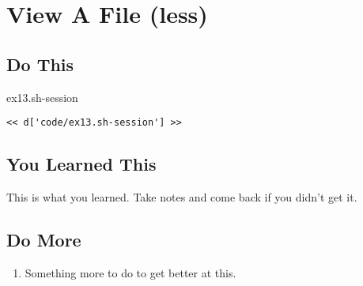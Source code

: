 \chapter{View A File (less)}

\section{Do This}

\begin{code}{ex13.sh-session}
\begin{Verbatim}
<< d['code/ex13.sh-session'] >>
\end{Verbatim}
\end{code}


\section{You Learned This}

This is what you learned.  Take notes and come back if you didn't get it.

\section{Do More}

\begin{enumerate}
\item Something more to do to get better at this.
\end{enumerate}

